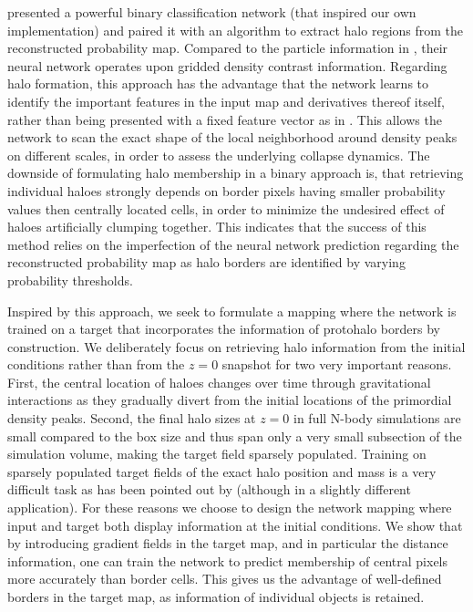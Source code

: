 \documentclass[fleqn,usenatbib]{mnras}
\begin{document}
\cite{Berger2019} presented a powerful binary classification network (that inspired our own implementation) and paired it with an algorithm to extract halo regions from the reconstructed probability map. Compared to the particle information in \cite{LucieSmith2018}, their neural network operates upon gridded density contrast information. Regarding halo formation, this approach has the advantage that the network learns to identify the important features in the input map and derivatives thereof itself, rather than being presented with a fixed feature vector as in \cite{LucieSmith2018}. This allows the network to scan the exact shape of the local neighborhood around density peaks on different scales, in order to assess the underlying collapse dynamics. The downside of formulating halo membership in a binary approach is, that retrieving individual haloes strongly depends on border pixels having smaller probability values then centrally located cells, in order to minimize the undesired effect of haloes artificially clumping together. This indicates that the success of this method relies on the imperfection of the neural network prediction regarding the reconstructed probability map as halo borders are identified by varying probability thresholds. \par
Inspired by this approach, we seek to formulate a mapping where the network is trained on a target that incorporates the information of protohalo borders by construction. 
We deliberately focus on retrieving halo information from the initial conditions rather than from the $z=0$ snapshot for two very important reasons. First, the central location of haloes changes over time through gravitational interactions as they gradually divert from the initial locations of the primordial density peaks.
Second, the final halo sizes at $z=0$ in full N-body simulations are small compared to the box size and thus span only a very small subsection of the simulation volume, making the target field sparsely populated. Training on sparsely populated target fields of the exact halo position and mass is a very difficult task as has been pointed out by \cite{Zhang2019} (although in a slightly different application). For these reasons we choose to design the network mapping where input and target both display information at the initial conditions.
We show that by introducing gradient fields in the target map, and in particular the distance information, one can train the network to predict membership of central pixels more accurately than border cells. This gives us the advantage of well-defined borders in the target map, as information of individual objects is retained.\par
\end{document}

